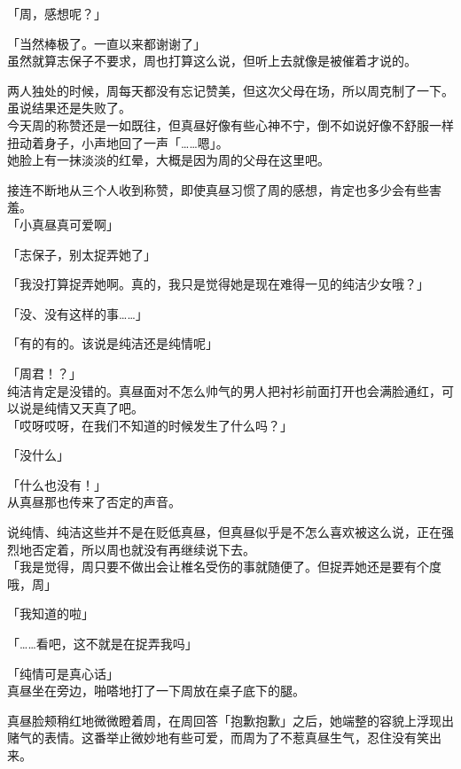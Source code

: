 「周，感想呢？」

「当然棒极了。一直以来都谢谢了」\\

虽然就算志保子不要求，周也打算这么说，但听上去就像是被催着才说的。

两人独处的时候，周每天都没有忘记赞美，但这次父母在场，所以周克制了一下。虽说结果还是失败了。\\

今天周的称赞还是一如既往，但真昼好像有些心神不宁，倒不如说好像不舒服一样扭动着身子，小声地回了一声「……嗯」。\\

她脸上有一抹淡淡的红晕，大概是因为周的父母在这里吧。

接连不断地从三个人收到称赞，即使真昼习惯了周的感想，肯定也多少会有些害羞。\\

「小真昼真可爱啊」

「志保子，别太捉弄她了」

「我没打算捉弄她啊。真的，我只是觉得她是现在难得一见的纯洁少女哦？」

「没、没有这样的事……」

「有的有的。该说是纯洁还是纯情呢」

「周君！？」\\

纯洁肯定是没错的。真昼面对不怎么帅气的男人把衬衫前面打开也会满脸通红，可以说是纯情又天真了吧。\\

「哎呀哎呀，在我们不知道的时候发生了什么吗？」

「没什么」

「什么也没有！」\\

从真昼那也传来了否定的声音。

说纯情、纯洁这些并不是在贬低真昼，但真昼似乎是不怎么喜欢被这么说，正在强烈地否定着，所以周也就没有再继续说下去。\\

「我是觉得，周只要不做出会让椎名受伤的事就随便了。但捉弄她还是要有个度哦，周」

「我知道的啦」

「……看吧，这不就是在捉弄我吗」

「纯情可是真心话」\\

真昼坐在旁边，啪嗒地打了一下周放在桌子底下的腿。

真昼脸颊稍红地微微瞪着周，在周回答「抱歉抱歉」之后，她端整的容貌上浮现出赌气的表情。这番举止微妙地有些可爱，而周为了不惹真昼生气，忍住没有笑出来。\\

